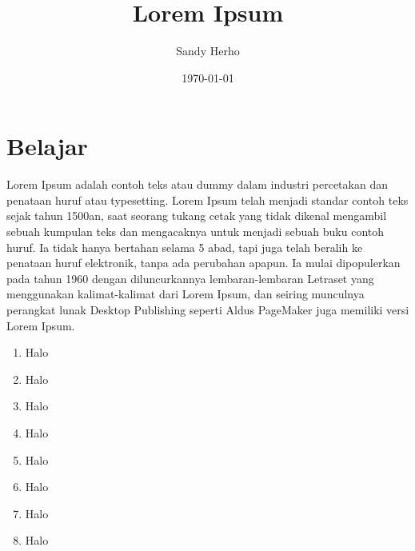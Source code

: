 \documentclass[11pt]{article}
\begin{document}
\title{Lorem Ipsum}
\author{Sandy Herho}
\date{\today}
\maketitle

\section{Belajar}
Lorem Ipsum adalah contoh teks atau dummy dalam industri percetakan dan penataan huruf atau typesetting. Lorem Ipsum telah menjadi standar contoh teks sejak tahun 1500an, saat seorang tukang cetak yang tidak dikenal mengambil sebuah kumpulan teks dan mengacaknya untuk menjadi sebuah buku contoh huruf. Ia tidak hanya bertahan selama 5 abad, tapi juga telah beralih ke penataan huruf elektronik, tanpa ada perubahan apapun. Ia mulai dipopulerkan pada tahun 1960 dengan diluncurkannya lembaran-lembaran Letraset yang menggunakan kalimat-kalimat dari Lorem Ipsum, dan seiring munculnya perangkat lunak Desktop Publishing seperti Aldus PageMaker juga memiliki versi Lorem Ipsum.
\begin{enumerate}
\item Halo
\item Halo
\item Halo
\item Halo
\item Halo
\item Halo
\item Halo
\item Halo
\end{enumerate}
\end{document}
